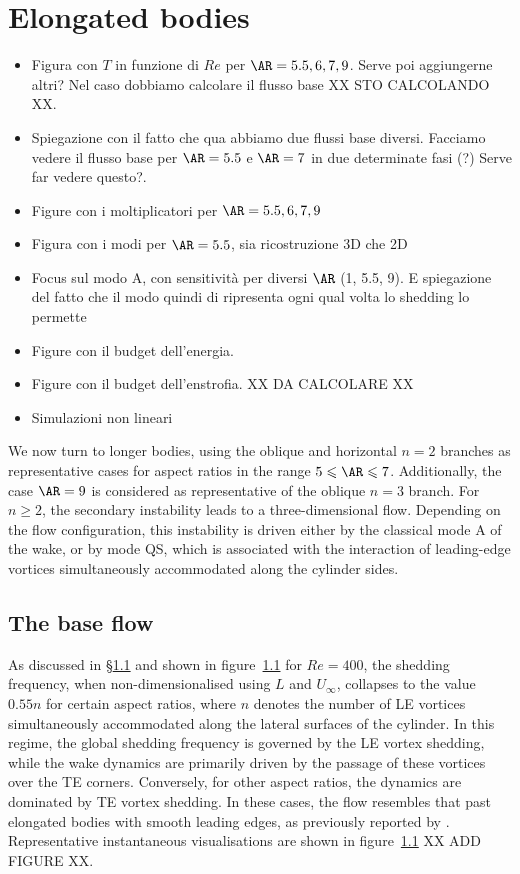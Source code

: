 \section{Elongated bodies}

\begin{itemize}
  \item Figura con $T$ in funzione di $Re$ per $\AR=5.5, 6, 7, 9$. Serve poi aggiungerne altri? Nel caso dobbiamo calcolare il flusso base XX STO CALCOLANDO XX.
  \item Spiegazione con il fatto che qua abbiamo due flussi base diversi. Facciamo vedere il flusso base per $\AR=5.5$ e $\AR=7$ in due determinate fasi (?) Serve far vedere questo?.  
  \item Figure con i moltiplicatori per $\AR=5.5, 6, 7, 9$
  \item Figura con i modi per $\AR=5.5$, sia ricostruzione 3D che 2D
  \item Focus sul modo A, con sensitività per diversi $\AR$ (1, 5.5, 9). E spiegazione del fatto che il modo quindi di ripresenta ogni qual volta lo shedding lo permette
  \item Figure con il budget dell'energia.
  \item Figure con il budget dell'enstrofia. XX DA CALCOLARE XX
  \item Simulazioni non lineari
\end{itemize}

We now turn to longer bodies, using the oblique and horizontal $n = 2$ branches as representative cases for aspect ratios in the range $5 \le \AR \le 7$. Additionally, the case $\AR = 9$ is considered as representative of the oblique $n = 3$ branch. For $n \ge 2$, the secondary instability leads to a three-dimensional flow. Depending on the flow configuration, this instability is driven either by the classical mode A of the wake, or by mode QS, which is associated with the interaction of leading-edge vortices simultaneously accommodated along the cylinder sides.

\subsection{The base flow}

As discussed in \S\ref{} and shown in figure~\ref{} for $Re = 400$, the shedding frequency, when non-dimensionalised using $L$ and $U_\infty$, collapses to the value $0.55n$ for certain aspect ratios, where $n$ denotes the number of LE vortices simultaneously accommodated along the lateral surfaces of the cylinder. In this regime, the global shedding frequency is governed by the LE vortex shedding, while the wake dynamics are primarily driven by the passage of these vortices over the TE corners. Conversely, for other aspect ratios, the dynamics are dominated by TE vortex shedding. In these cases, the flow resembles that past elongated bodies with smooth leading edges, as previously reported by \cite{chiarini-quadrio-auteri-2022}. Representative instantaneous visualisations are shown in figure~\ref{} XX ADD FIGURE XX.

